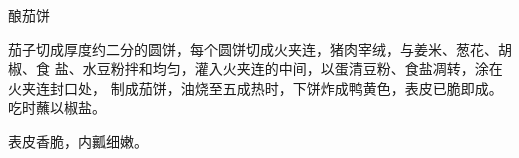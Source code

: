 \begin{recipe}{酿茄饼}

\ingredients


\preparation

茄子切成厚度约二分的圆饼，每个圆饼切成火夹连，猪肉宰绒，与姜米、葱花、胡椒、食
盐、水豆粉拌和均匀，灌入火夹连的中间，以蛋清豆粉、食盐凋转，涂在火夹连封口处，
制成茄饼，油烧至五成热时，下饼炸成鸭黄色，表皮已脆即成。吃时蘸以椒盐。

\features

表皮香脆，内瓤细嫩。

\end{recipe}

